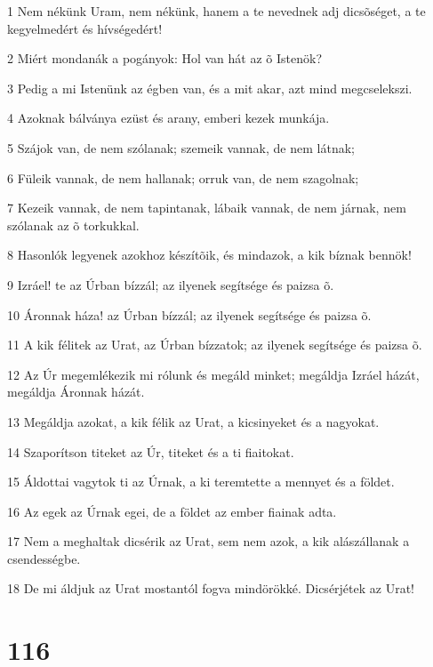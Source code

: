 \par 1 Nem nékünk Uram, nem nékünk, hanem a te nevednek adj dicsõséget, a te kegyelmedért és hívségedért!
\par 2 Miért mondanák a pogányok: Hol van hát az õ Istenök?
\par 3 Pedig a mi Istenünk az égben van, és a mit akar, azt mind megcselekszi.
\par 4 Azoknak bálványa ezüst és arany, emberi kezek munkája.
\par 5 Szájok van, de nem szólanak; szemeik vannak, de nem látnak;
\par 6 Füleik vannak, de nem hallanak; orruk van, de nem szagolnak;
\par 7 Kezeik vannak, de nem tapintanak, lábaik vannak, de nem járnak, nem szólanak az õ torkukkal.
\par 8 Hasonlók legyenek azokhoz készítõik, és mindazok, a kik bíznak bennök!
\par 9 Izráel! te az Úrban bízzál; az ilyenek segítsége és paizsa õ.
\par 10 Áronnak háza! az Úrban bízzál; az ilyenek segítsége és paizsa õ.
\par 11 A kik félitek az Urat, az Úrban bízzatok; az ilyenek segítsége és paizsa õ.
\par 12 Az Úr megemlékezik mi rólunk és megáld minket; megáldja Izráel házát, megáldja Áronnak házát.
\par 13 Megáldja azokat, a kik félik az Urat, a kicsinyeket és a nagyokat.
\par 14 Szaporítson titeket az Úr, titeket és a ti fiaitokat.
\par 15 Áldottai vagytok ti az Úrnak, a ki teremtette a mennyet és a földet.
\par 16 Az egek az Úrnak egei, de a földet az ember fiainak adta.
\par 17 Nem a meghaltak dicsérik az Urat, sem nem azok, a kik alászállanak a csendességbe.
\par 18 De mi áldjuk az Urat mostantól fogva mindörökké. Dicsérjétek az Urat!

\chapter{116}


